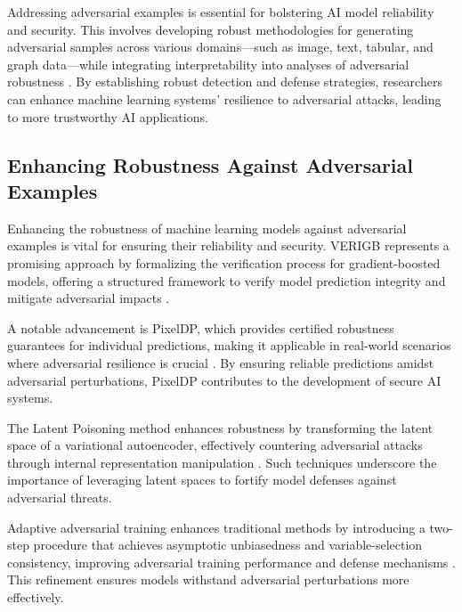 Addressing adversarial examples is essential for bolstering AI model reliability and security. This involves developing robust methodologies for generating adversarial samples across various domains—such as image, text, tabular, and graph data—while integrating interpretability into analyses of adversarial robustness \cite{liu2020adversarialattacksdefensesinterpretation}. By establishing robust detection and defense strategies, researchers can enhance machine learning systems' resilience to adversarial attacks, leading to more trustworthy AI applications.

\subsection{Enhancing Robustness Against Adversarial Examples} \label{subsec:Enhancing Robustness Against Adversarial Examples}

Enhancing the robustness of machine learning models against adversarial examples is vital for ensuring their reliability and security. VERIGB represents a promising approach by formalizing the verification process for gradient-boosted models, offering a structured framework to verify model prediction integrity and mitigate adversarial impacts \cite{einziger2019verifyingrobustnessgradientboosted}.

A notable advancement is PixelDP, which provides certified robustness guarantees for individual predictions, making it applicable in real-world scenarios where adversarial resilience is crucial \cite{lecuyer2019certifiedrobustnessadversarialexamples}. By ensuring reliable predictions amidst adversarial perturbations, PixelDP contributes to the development of secure AI systems.

The Latent Poisoning method enhances robustness by transforming the latent space of a variational autoencoder, effectively countering adversarial attacks through internal representation manipulation \cite{creswell2017latentpoisonadversarialattacks}. Such techniques underscore the importance of leveraging latent spaces to fortify model defenses against adversarial threats.

Adaptive adversarial training enhances traditional methods by introducing a two-step procedure that achieves asymptotic unbiasedness and variable-selection consistency, improving adversarial training performance and defense mechanisms \cite{xie2024asymptoticbehavioradversarialtraining}. This refinement ensures models withstand adversarial perturbations more effectively.

